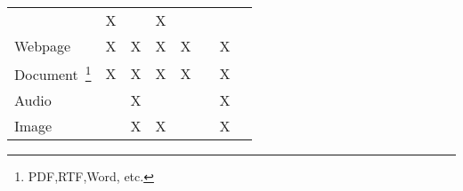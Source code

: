 \begin{table}[tbph]
\begin{minipage}{\textwidth}
\begin{tabular}{p{3cm}ccccccl}
                                                                         &
            X

                                                                         &

                                                                         & X
                                                                         &
            \cite{kim2009retrieval}
            \tabularnewline
            Webpage                                                      & X
                                                                         & X
                                                                         & X                                                     & X
                                                                         &                                                       & X
                                                                         & \cite{kim2009retrieval,soules2005connections}
            \tabularnewline

            \rowcolor[rgb]
            { .851,  .851,  .851} Document~\footnote{PDF,RTF,Word, etc.} & X                                                     & X                                                                                          & X                                                       & X                                                                                          &                                                       & X                                                                                         & \cite{kim2009retrieval,soules2005connections,hellerstein2017ground,vianna2019searching}
            \tabularnewline

            Audio                                                        &                                                       & X                                                                                          &                                                         &                                                                                            &                                                       & X                                                                                         & \cite{gemmell2002mylifebits}
            \tabularnewline

            \rowcolor[rgb]{ .851,  .851,  .851}
            Image                                                        &                                                       & X                                                                                          & X                                                       &                                                                                            &                                                       & X                                                                                         & \cite{gemmell2002mylifebits}
            \tabularnewline


\end{tabular}
\end{minipage}
\end{table}
